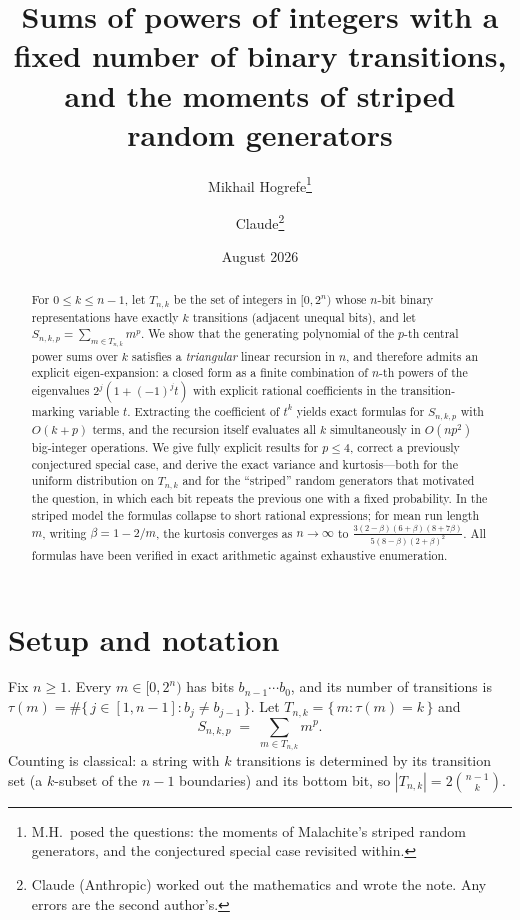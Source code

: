 \documentclass[11pt]{article}
\title{Sums of powers of integers with a fixed number of binary transitions,\\
and the moments of striped random generators}
\author{Mikhail Hogrefe\thanks{M.H.\ posed the questions: the moments of Malachite's striped
random generators, and the conjectured special case revisited within.}
\and Claude\thanks{Claude (Anthropic) worked out the mathematics and wrote the note. Any
errors are the second author's.}}
\date{August 2026}
\theoremstyle{remark}
\begin{document}
\maketitle

\begin{abstract}
For $0 \le k \le n-1$, let $T_{n,k}$ be the set of integers in $[0, 2^n)$ whose $n$-bit binary
representations have exactly $k$ transitions (adjacent unequal bits), and let
$S_{n,k,p} = \sum_{m \in T_{n,k}} m^p$. We show that the generating polynomial of the $p$-th
central power sums over $k$ satisfies a \emph{triangular} linear recursion in $n$, and therefore
admits an explicit eigen-expansion: a closed form as a finite combination of $n$-th powers of the
eigenvalues $2^j(1 + (-1)^j t)$ with explicit rational coefficients in the transition-marking
variable $t$. Extracting the coefficient of $t^k$ yields exact formulas for $S_{n,k,p}$ with
$O(k+p)$ terms, and the recursion itself evaluates all $k$ simultaneously in $O(n p^2)$
big-integer operations. We give fully explicit results for $p \le 4$, correct a previously
conjectured special case, and derive the exact variance and kurtosis---both for the uniform
distribution on $T_{n,k}$ and for the ``striped'' random generators that motivated the question,
in which each bit repeats the previous one with a fixed probability. In the striped model the
formulas collapse to short rational expressions; for mean run length $m$, writing
$\beta = 1 - 2/m$, the kurtosis converges as $n \to \infty$ to
$\frac{3(2-\beta)(6+\beta)(8+7\beta)}{5(8-\beta)(2+\beta)^2}$.
All formulas have been verified in exact arithmetic against exhaustive enumeration.
\end{abstract}

\section{Setup and notation}

Fix $n \ge 1$. Every $m \in [0, 2^n)$ has bits $b_{n-1} \cdots b_0$, and its number of
transitions is $\tau(m) = \#\{\, j \in [1, n-1] : b_j \ne b_{j-1} \,\}$. Let
$T_{n,k} = \{\, m : \tau(m) = k \,\}$ and
\[
S_{n,k,p} \;=\; \sum_{m \in T_{n,k}} m^p .
\]
Counting is classical: a string with $k$ transitions is determined by its transition set (a
$k$-subset of the $n-1$ boundaries) and its bottom bit, so $|T_{n,k}| = 2\binom{n-1}{k}$.
\end{document}
